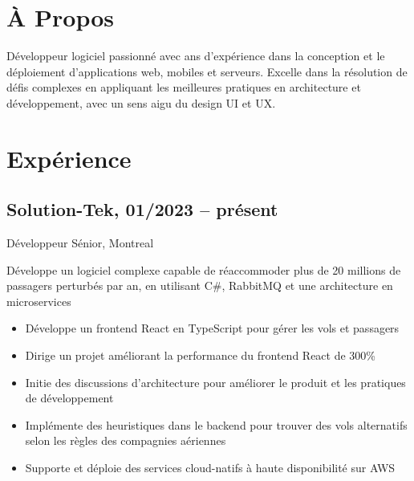 \documentclass{article}
\begin{document}
\begin{paracol}{2}
\begin{rightcolumn}
    \vspace{-2.5em}
    \section{À Propos}

    Développeur logiciel passionné avec  ans d’expérience dans la conception et le
    déploiement d’applications web, mobiles et serveurs. Excelle dans la résolution de défis complexes en
    appliquant les meilleures pratiques en architecture et développement, avec un sens aigu du design UI et UX. 

    \section{Expérience}

    \subsection{Solution-Tek, 01/2023 -- présent}
    {Développeur Sénior, Montreal\par}
    {
      Développe un logiciel complexe capable de réaccommoder plus de 20 millions de passagers perturbés par an, en utilisant C\#, RabbitMQ et une architecture en microservices
    \par}
    \begin{itemize}
      \item Développe un frontend React en TypeScript pour gérer les vols et passagers
      \item Dirige un projet améliorant la performance du frontend React de 300\%
      \item Initie des discussions d’architecture pour améliorer le produit et les pratiques de développement
      \item Implémente des heuristiques dans le backend pour trouver des vols alternatifs selon les règles des compagnies aériennes
      \item Supporte et déploie des services cloud-natifs à haute disponibilité sur AWS
    \end{itemize}


\end{rightcolumn}
\end{paracol}
\end{document}

